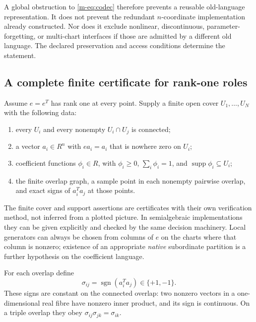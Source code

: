 \documentclass[11pt]{article}
\theoremstyle{definition}
\theoremstyle{remark}
\newcommand{\supp}{\operatorname{supp}}
\begin{document}
A global obstruction to \eqref{m-eq:codec} therefore prevents a reusable old-language representation. It does not prevent the redundant $n$-coordinate implementation already constructed. Nor does it exclude nonlinear, discontinuous, parameter-forgetting, or multi-chart interfaces if those are admitted by a different old language. The declared preservation and access conditions determine the statement.

\subsection{A complete finite certificate for rank-one roles}
Assume $e=e^T$ has rank one at every point. Supply a finite open cover $U_1,\ldots,U_N$ with the following data:
\begin{enumerate}
\item every $U_i$ and every nonempty $U_i\cap U_j$ is connected;
\item a vector $a_i\in R^n$ with $ea_i=a_i$ that is nowhere zero on $U_i$;
\item coefficient functions $\phi_i\in R$, with $\phi_i\ge0$, $\sum_i\phi_i=1$, and $\supp\phi_i\subseteq U_i$;
\item the finite overlap graph, a sample point in each nonempty pairwise overlap, and exact signs of $a_i^Ta_j$ at those points.
\end{enumerate}
The finite cover and support assertions are certificates with their own verification method, not inferred from a plotted picture. In semialgebraic implementations they can be given explicitly and checked by the same decision machinery. Local generators can always be chosen from columns of $e$ on the charts where that column is nonzero; existence of an appropriate \emph{native} subordinate partition is a further hypothesis on the coefficient language.

For each overlap define
\[
             \sigma_{ij}=\operatorname{sgn}(a_i^Ta_j)\in\{+1,-1\}.
\]
These signs are constant on the connected overlap: two nonzero vectors in a one-dimensional real fibre have nonzero inner product, and its sign is continuous. On a triple overlap they obey $\sigma_{ij}\sigma_{jk}=\sigma_{ik}$.
\end{document}
